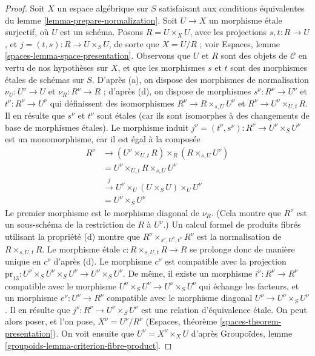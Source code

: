 \begin{proof}
\medskip\noindent
Soit $X$ un espace algébrique sur $S$ satisfaisant
aux conditions équivalentes du lemme \ref{lemma-prepare-normalization}.
Soit $U \to X$ un morphisme étale surjectif, où $U$ est un schéma.
Posons $R = U \times_X U$, avec les projections $s, t : R \to U$, et
$j = (t, s) : R \to U \times_S U$, de sorte que $X = U/R$ ; voir
Espaces, lemme \ref{spaces-lemma-space-presentation}.
Observons que $U$ et $R$ sont des objets de $\mathcal{C}$
en vertu de nos hypothèses sur $X$, et que les morphismes
$s$ et $t$ sont des morphismes étales de schémas sur $S$.
D'après (a), on dispose des morphismes de normalisation
$\nu_U : U^\nu \to U$ et $\nu_R : R^\nu \to R$ ;
d'après (d), on dispose de morphismes $s^\nu : R^\nu \to U^\nu$ et
$t^\nu : R^\nu \to U^\nu$ qui définissent des
isomorphismes $R^\nu \to R \times_{s, U} U^\nu$ et
$R^\nu \to U^\nu \times_{U, t} R$. Il en résulte que
$s^\nu$ et $t^\nu$ sont étales (car ils sont isomorphes
à des changements de base de morphismes étales). Le morphisme induit
$j^\nu = (t^\nu, s^\nu) : R^\nu \to U^\nu \times_S U^\nu$
est un monomorphisme, car il est égal à la composée
\begin{align*}
R^\nu
& \to
(U^\nu \times_{U, t} R) \times_R (R \times_{s, U} U^\nu) \\
& =
U^\nu \times_{U, t} R \times_{s, U} U^\nu \\
& \xrightarrow{j}
U^\nu \times_U (U \times_S U) \times_U U^\nu \\
& =
U^\nu \times_S U^\nu
\end{align*}
Le premier morphisme est le morphisme diagonal de $\nu_R$.
(Cela montre que $R^\nu$ est un sous-schéma de la restriction de
$R$ à $U^\nu$.) Un calcul formel de produits fibrés
utilisant la propriété (d) montre que
$R^\nu \times_{s^\nu, U^\nu, t^\nu} R^\nu$ est la normalisation
de $R \times_{s, U, t} R$. Le morphisme étale
$c : R \times_{s, U, t} R \to R$ se prolonge donc de manière unique en $c^\nu$ d'après (d).
Le morphisme $c^\nu$ est compatible avec la projection
$\text{pr}_{13} : U^\nu \times_S U^\nu \times_S U^\nu \to U^\nu \times_S U^\nu$.
De même, il existe un morphisme $i^\nu : R^\nu \to R^\nu$
compatible avec le morphisme $U^\nu \times_S U^\nu \to U^\nu \times_S U^\nu$
qui échange les facteurs, et un morphisme $e^\nu : U^\nu \to R^\nu$
compatible avec le morphisme diagonal $U^\nu \to U^\nu \times_S U^\nu$.
Il en résulte que $j^\nu : R^\nu \to U^\nu \times_S U^\nu$
est une relation d'équivalence étale.
On peut alors poser, et l'on pose, $X^\nu = U^\nu/R^\nu$
(Espaces, théorème \ref{spaces-theorem-presentation}).
On voit ensuite que $U^\nu = X^\nu \times_X U$ d'après
Groupoïdes, lemme \ref{groupoids-lemma-criterion-fibre-product}.


\end{proof}
